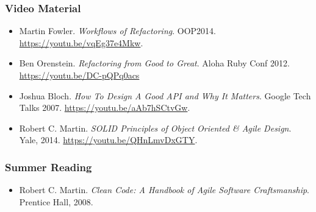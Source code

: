 \begin{frame}

\frametitle{Video Material}

\footnotesize

\begin{itemize}

\item Martin Fowler. \emph{Workflows of Refactoring}. OOP2014.
\url{https://youtu.be/vqEg37e4Mkw}.

\item Ben Orenstein. \emph{Refactoring from Good to Great}. Aloha Ruby Conf
2012. \url{https://youtu.be/DC-pQPq0acs}

\item Joshua Bloch. \emph{How To Design A Good API and Why It Matters}. Google
Tech Talks 2007. \url{https://youtu.be/aAb7hSCtvGw}.

\item Robert C. Martin. \emph{SOLID Principles of Object Oriented \& Agile
Design}. Yale, 2014. \url{https://youtu.be/QHnLmvDxGTY}.


\end{itemize}

\end{frame}


\begin{frame}

\frametitle{Summer Reading}

\footnotesize

\begin{itemize}

\item Robert C. Martin. \emph{Clean Code: A Handbook of Agile Software
Craftsmanship}. Prentice Hall, 2008.

\end{itemize}

\end{frame}
